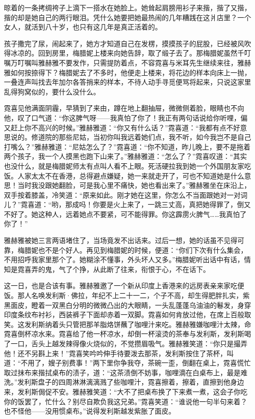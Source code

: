\par 晾着的一条拷绸袴子上滴下一搭水在她脸上。她耸起肩膀用衫子来揩，揩了又揩，揩的却是她自己的两行眼泪。凭什么她要把她最热闹的几年糟践在这爿店里？一个女人，就活到八十岁，也只有这几年是真正活着的。
\par 孩子撒完了尿，闹起来了，她方才知道自己在发楞，摸摸孩子的屁股，已经被风吹得冰凉的。回到房里，梅腊妮上楼来向她告辞，取了缎子去了。那梅腊妮虽然千叮嘱万叮嘱叫雅赫雅不要发作，只需提防着点，不容霓喜与米耳先生继续来往，雅赫雅如何按捺得下？梅腊妮去了不多时，他便走上楼来，将花边的样本向床上一抛，一叠连声叫找去年加尔各答捎来的样本，不待人动手寻觅便骂将起来，只说这家里乱得狗窝似的，要什么没什么。
\par 霓喜见他满面阴霾，早猜到了来由，蹲在地上翻抽屉，微微侧着脸，眼睛也不向他，叹了口气道：“你这脾气呀——我真怕了你了！我正有两句话说给你听哩，偏又赶上你不高兴的时候。”雅赫雅道：“你又有什么话？”霓喜道：“我都有点不好意思说的。修道院的那些尼姑，当初你叫我远着她们点，我不听，如今我岂不是自己打嘴么？”雅赫雅道：“尼姑怎么了？”霓喜道：“你不知道，昨儿晚上，要不是拖着两个孩子，我一个人摸黑也跑下山来了。”雅赫雅道：“怎么了？”霓喜叹道：“其实也没什么，就是梅腊妮师太有点叫人看不上眼。死活硬拉我到她一个外国朋友家吃饭。人家太太不在香港，总得避点嫌疑，她一来就走开了，可也不知道她是什么意思！当时我没跟她翻脸，可是我心里不痛快，她也看出来了。”雅赫雅坐在床沿上，双手按着膝盖，冷笑道：“原来如此。刚才她在这里，你怎么不当面跟她对一对词儿？”霓喜道：“哟，那成吗！你要是火上来了，一跳三丈高，真把她得罪了，倒又不好了。她这种人，远着她点不要紧，可不能得罪。你这霹雳火脾气……我真怕了你了！”
\par 雅赫雅被她三言两语堵住了，当场竟发不出话来。过后一想，她的话虽不见得可靠，梅腊妮也不是个好人。再见到梅腊妮的时候，便道：“你们下次有什么集会，不用招呼我家里那个了。她糊涂不懂事，外头坏人又多。”梅腊妮听出话中有话，情知是霓喜弄的鬼，气了个挣，从此断了往来，衔恨于心，不在话下。
\par 这一日，也是合该有事。雅赫雅邀了一个新从印度上香港来的远房表亲来家吃便饭。那人名唤发利斯·佛拉，年纪不上二十一二，个子不高，却生得肥胖扎实，紫黑面皮，瞪着一双黑白分明的微微凸出的大眼睛，一头乱蓬蓬乌油油的鬈发，身穿印度条纹布衬衫，西装裤子下面却赤着一双脚。霓喜如何肯放过他，在席上百般取笑。这发利斯纳着头只管把那羊脂烙饼蘸了咖哩汁来吃。雅赫雅嫌咖哩汁太辣，命霓喜倒杯凉水来。霓喜给了他一杯凉水，却倒一杯滚烫的茶奉与发利斯，发利斯喝了一口，舌头上越发辣得像火烧似的，不觉攒眉吸气。雅赫雅笑道：“你只是撮弄他！还不另斟上来！”霓喜笑吟吟伸手待要泼去那茶，发利斯按住了茶杯，叫道：“不用了，嫂子别费事！”两下里你争我夺，茶碗一歪，倒翻在桌上，霓喜慌忙取过抹布来揩拭桌布的渍子，道：“这茶渍倒不妨事，咖哩滴在白桌布上，最是难洗。”发利斯盘子的四周淋淋漓漓溅了些咖哩汁，霓喜擦着，擦着，直擦到他身边来，发利斯侷促不安。雅赫雅笑道：“大不了把桌布换了下来煮一煮，这会子你吃你的饭罢了，忙什么？别尽自欺负我这兄弟。”霓喜笑道：“谁说他一句半句来着？也不怪他——没用惯桌布。”说得发利斯越发紫胀了面皮。
